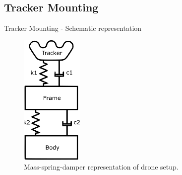 \subsection{Tracker Mounting}
\label{subsec:Track}

\begin{frame}{Tracker Mounting - Schematic representation}

    \begin{figure}[h]
    \centering
    \includegraphics[width=3cm]{Figures/mass_damper_setup.png}
    \caption{Mass-spring-damper representation of drone setup.}
    \label{fig:mass_spring}
    \end{figure}
    		
\end{frame}
